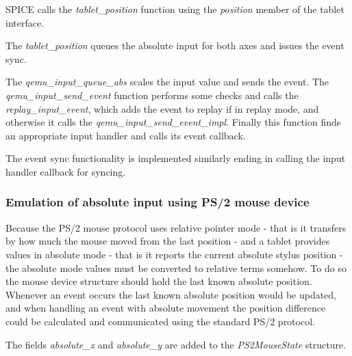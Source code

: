 SPICE calls the \emph{tablet\_position} function using the \emph{position}
member of the tablet interface.

\begin{codeblock}
    
\end{codeblock}

\noindent
The \emph{tablet\_position} queues the absolute input for both axes and issues
the event sync.

The \emph{qemu\_input\_queue\_abs} scales the input value and sends the event.
The \emph{qemu\_input\_send\_event} function performs some checks and calls the
\emph{replay\_input\_event}, which adds the event to replay if in replay mode,
and otherwise it calls the \emph{qemu\_input\_send\_event\_impl}.  Finally this
function finds an appropriate input handler and calls its event callback.

\begin{codeblock}
    
    
    
\end{codeblock}

\noindent
The event sync functionality is implemented similarly ending in calling the
input handler callback for syncing.

\subsubsection{Emulation of absolute input using PS/2 mouse device}

Because the PS/2 mouse protocol uses relative pointer mode - that is it
transfers by how much the mouse moved from the last position - and a tablet
provides values in absolute mode - that is it reports the current absolute
stylus position - the absolute mode values must be converted to relative terms
somehow.  To do so the mouse device structure should hold the last known
absolute position.  Whenever an event occurs the last known absolute position
would be updated, and when handling an event with absolute movement the position
difference could be calculated and communicated using the standard PS/2
protocol.

The fields \emph{absolute\_x} and \emph{absolute\_y} are added to the
\emph{PS2MouseState} structure.

